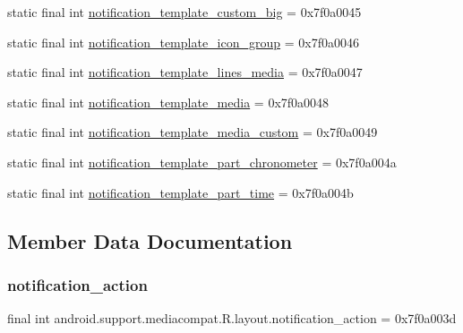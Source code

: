 \begin{DoxyCompactItemize}
static final int \mbox{\hyperlink{classandroid_1_1support_1_1mediacompat_1_1R_1_1layout_a7cfbf2cf8fead47542cc3d9f6fa76af3}{notification\+\_\+template\+\_\+custom\+\_\+big}} = 0x7f0a0045
\item 
static final int \mbox{\hyperlink{classandroid_1_1support_1_1mediacompat_1_1R_1_1layout_a39993db7633151eb09a67e32ea638006}{notification\+\_\+template\+\_\+icon\+\_\+group}} = 0x7f0a0046
\item 
static final int \mbox{\hyperlink{classandroid_1_1support_1_1mediacompat_1_1R_1_1layout_ade9024eff004c3faddcf47d74582dfe8}{notification\+\_\+template\+\_\+lines\+\_\+media}} = 0x7f0a0047
\item 
static final int \mbox{\hyperlink{classandroid_1_1support_1_1mediacompat_1_1R_1_1layout_ad4b1b9880ac48b0cdd66684e80bfa97c}{notification\+\_\+template\+\_\+media}} = 0x7f0a0048
\item 
static final int \mbox{\hyperlink{classandroid_1_1support_1_1mediacompat_1_1R_1_1layout_ad030dc38912f4e9d3d6220e962a42065}{notification\+\_\+template\+\_\+media\+\_\+custom}} = 0x7f0a0049
\item 
static final int \mbox{\hyperlink{classandroid_1_1support_1_1mediacompat_1_1R_1_1layout_acf044bc944b7a154c52653891074c05c}{notification\+\_\+template\+\_\+part\+\_\+chronometer}} = 0x7f0a004a
\item 
static final int \mbox{\hyperlink{classandroid_1_1support_1_1mediacompat_1_1R_1_1layout_ac483500984025c7db556bf3c6d4cfc49}{notification\+\_\+template\+\_\+part\+\_\+time}} = 0x7f0a004b
\end{DoxyCompactItemize}


\subsection{Member Data Documentation}
\mbox{\label{classandroid_1_1support_1_1mediacompat_1_1R_1_1layout_ab25d299914399f971acb340817848876}} 
\subsubsection{\texorpdfstring{notification\+\_\+action}{notification\_action}}
{\footnotesize\ttfamily final int android.\+support.\+mediacompat.\+R.\+layout.\+notification\+\_\+action = 0x7f0a003d\hspace{0.3cm}{\ttfamily [static]}}

